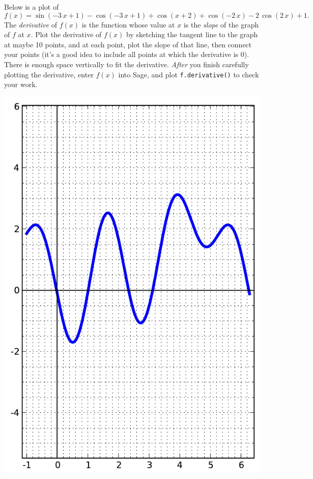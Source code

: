 Below is a plot of $$f(x)=\sin\left(-3 \, x + 1\right) - \cos\left(-3 \, x + 1\right) + \cos\left(x + 2\right) + \cos\left(-2 \, x\right) - 2 \, \cos\left(2 \, x\right) + 1.$$  The {\em \color{red}derivative} of $f(x)$ is the function whose value at $x$ is the {\em slope} of the graph of $f$ at $x$.  Plot the derivative of $f(x)$ by sketching the tangent line to the graph at maybe 10 points, and at each point, plot the slope of that line, then connect your points (it's a good idea to include all points at which the derivative is 0).  There is enough space vertically to fit the derivative.  {\em After} you finish carefully plotting the derivative, enter $f(x)$ into Sage, and plot {\color{blue}\verb|f.derivative()|} to check your work.
\begin{center}\includegraphics{functions/70.pdf}\end{center}\newpage

